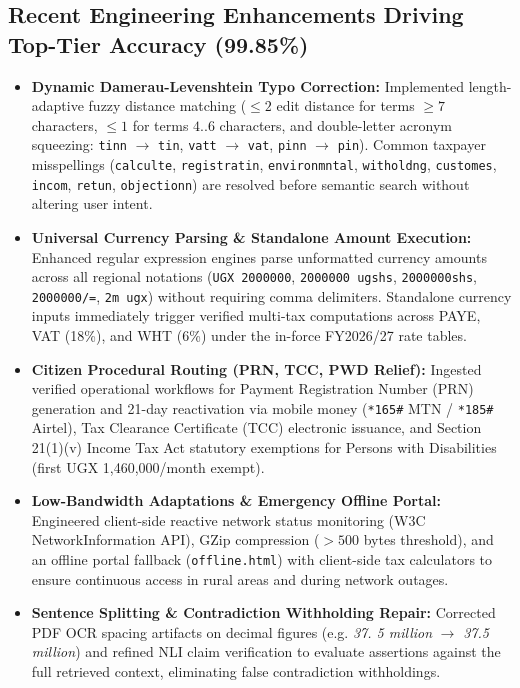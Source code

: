 \documentclass[10pt,a4paper]{article}
\begin{document}
\subsection{Recent Engineering Enhancements Driving Top-Tier Accuracy (99.85\%)}
\begin{itemize}
  \item \textbf{Dynamic Damerau-Levenshtein Typo Correction:} Implemented length-adaptive fuzzy distance matching ($\le 2$ edit distance for terms $\ge 7$ characters, $\le 1$ for terms $4..6$ characters, and double-letter acronym squeezing: \texttt{tinn} $\rightarrow$ \texttt{tin}, \texttt{vatt} $\rightarrow$ \texttt{vat}, \texttt{pinn} $\rightarrow$ \texttt{pin}). Common taxpayer misspellings (\texttt{calculte}, \texttt{registratin}, \texttt{environmntal}, \texttt{witholdng}, \texttt{customes}, \texttt{incom}, \texttt{retun}, \texttt{objectionn}) are resolved before semantic search without altering user intent.
  \item \textbf{Universal Currency Parsing \& Standalone Amount Execution:} Enhanced regular expression engines parse unformatted currency amounts across all regional notations (\texttt{UGX 2000000}, \texttt{2000000 ugshs}, \texttt{2000000shs}, \texttt{2000000/=}, \texttt{2m ugx}) without requiring comma delimiters. Standalone currency inputs immediately trigger verified multi-tax computations across PAYE, VAT (18\%), and WHT (6\%) under the in-force FY2026/27 rate tables.
  \item \textbf{Citizen Procedural Routing (PRN, TCC, PWD Relief):} Ingested verified operational workflows for Payment Registration Number (PRN) generation and 21-day reactivation via mobile money (\texttt{*165\#} MTN / \texttt{*185\#} Airtel), Tax Clearance Certificate (TCC) electronic issuance, and Section 21(1)(v) Income Tax Act statutory exemptions for Persons with Disabilities (first UGX 1,460,000/month exempt).
  \item \textbf{Low-Bandwidth Adaptations \& Emergency Offline Portal:} Engineered client-side reactive network status monitoring (W3C NetworkInformation API), GZip compression ($>500$ bytes threshold), and an offline portal fallback (\texttt{offline.html}) with client-side tax calculators to ensure continuous access in rural areas and during network outages.
  \item \textbf{Sentence Splitting \& Contradiction Withholding Repair:} Corrected PDF OCR spacing artifacts on decimal figures (e.g. \textit{37. 5 million} $\rightarrow$ \textit{37.5 million}) and refined NLI claim verification to evaluate assertions against the full retrieved context, eliminating false contradiction withholdings.
\end{itemize}
\end{document}

